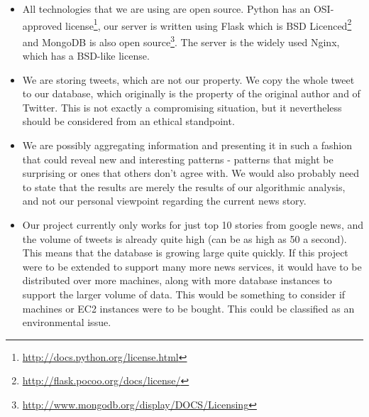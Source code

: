 \documentclass[a4paper,12pt]{article}
\begin{document}
	\begin{itemize}
	  
	  \item All technologies that we are using are open source. Python has an OSI-approved license\footnote{\url {http://docs.python.org/license.html}}, our server is written using Flask which is BSD Licenced\footnote{\url{http://flask.pocoo.org/docs/license/}} and MongoDB is also open source\footnote{\url{http://www.mongodb.org/display/DOCS/Licensing}}. The server is the widely used Nginx, which has a BSD-like license.
	  
		\item We are storing tweets, which are not our property. We copy the whole tweet to our database, which originally is the property of the original author and of Twitter. This is not exactly a compromising situation, but it nevertheless should be considered from an ethical standpoint.
		
		\item We are possibly aggregating information and presenting it in such a fashion that could reveal new and interesting patterns - patterns that might be surprising or ones that others don't agree with. We would also probably need to state that the results are merely the results of our algorithmic analysis, and not our personal viewpoint regarding the current news story.
		
		\item Our project currently only works for just top 10 stories from google news, and the volume of tweets is already quite high (can be as high as 50 a second). This means that the database is growing large quite quickly. If this project were to be extended to support many more news services, it would have to be distributed over more machines, along with more database instances to support the larger volume of data. This would be something to consider if machines or EC2 instances were to be bought. This could be classified as an environmental issue.
	  
  \end{itemize}
  
\end{document}

